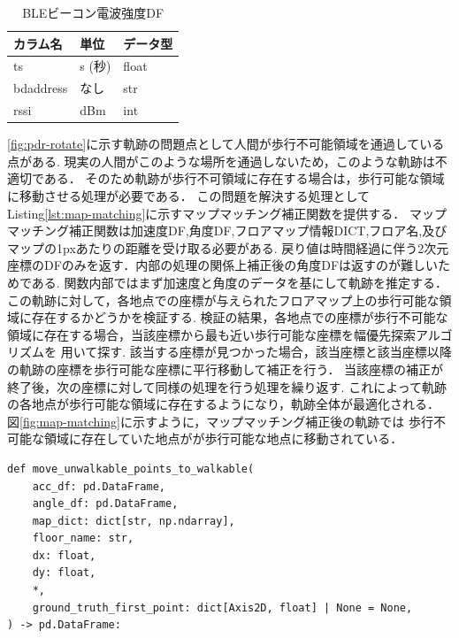 \begin{table}[h]
	\centering
	\begin{tabular}{lll}
		\toprule
		カラム名      & 単位    & データ型  \\
		\midrule
		ts        & s (秒) & float \\
		bdaddress & なし    & str   \\
		rssi      & dBm   & int   \\
		\bottomrule
	\end{tabular}
	\caption{BLEビーコン電波強度DF}
\end{table}

\ref{fig:pdr-rotate}に示す軌跡の問題点として人間が歩行不可能領域を通過している点がある.
現実の人間がこのような場所を通過しないため，このような軌跡は不適切である．
そのため軌跡が歩行不可領域に存在する場合は，歩行可能な領域に移動させる処理が必要である．
この問題を解決する処理としてListing\ref{lst:map-matching}に示すマップマッチング補正関数を提供する．
マップマッチング補正関数は加速度DF,角度DF,フロアマップ情報DICT,フロア名,及びマップの1pxあたりの距離を受け取る必要がある.
戻り値は時間経過に伴う2次元座標のDFのみを返す．内部の処理の関係上補正後の角度DFは返すのが難しいためである.
関数内部ではまず加速度と角度のデータを基にして軌跡を推定する．
この軌跡に対して，各地点での座標が与えられたフロアマップ上の歩行可能な領域に存在するかどうかを検証する.
検証の結果，各地点での座標が歩行不可能な領域に存在する場合，当該座標から最も近い歩行可能な座標を幅優先探索アルゴリズムを
用いて探す.
該当する座標が見つかった場合，該当座標と該当座標以降の軌跡の座標を歩行可能な座標に平行移動して補正を行う．
当該座標の補正が終了後，次の座標に対して同様の処理を行う処理を繰り返す.
これによって軌跡の各地点が歩行可能な領域に存在するようになり，軌跡全体が最適化される．
図\ref{fig:map-matching}に示すように，マップマッチング補正後の軌跡では
歩行不可能な領域に存在していた地点がが歩行可能な地点に移動されている．

\begin{lstlisting}[caption={マップマッチング補正}, label=lst:map-matching]
def move_unwalkable_points_to_walkable(
    acc_df: pd.DataFrame,
    angle_df: pd.DataFrame,
    map_dict: dict[str, np.ndarray],
    floor_name: str,
    dx: float,
    dy: float,
    *,
    ground_truth_first_point: dict[Axis2D, float] | None = None,
) -> pd.DataFrame:

\end{lstlisting}


